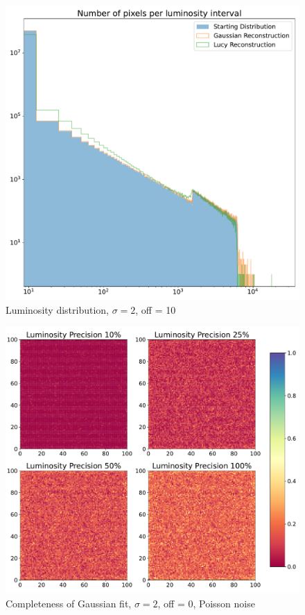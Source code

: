 \documentclass[a4paper]{article}
\begin{document}
		\newpage
		\null
		\vfill
		\begin{figure}[h]
			\centering
			\includegraphics[height=0.4\textheight]{backgauss2_lumin.pdf}
			\caption{Luminosity distribution, $\sigma = 2$, off = 10}
			\label{fig:bl}
		\end{figure}
		\vfill
		\newpage
		\begin{figure}[h!]
			\centering
			\includegraphics[height=0.4\textheight]{poissgauss2_boards_gauss.pdf}
			\caption{Completeness of Gaussian fit, $\sigma = 2$, off = 0, Poisson noise}
			\label{fig:pbg}
		\end{figure}
\end{document}

